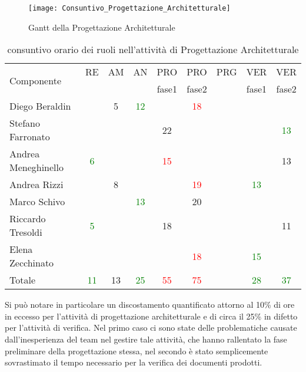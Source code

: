 \begin{figure}[h]
  \texttt{[image: Consuntivo\_Progettazione\_Architetturale]}
\caption{Gantt della Progettazione Architetturale}\label{fig:ganttprogconsuntivo}
\end{figure}

\begin{table}[h]
\centering
\begin{tabular}{|l|c|c|c|c|c|c|c|c|}
\hline
\multirow{2}{*}{Componente}& RE& AM& AN& PRO& PRO& PRG& VER& VER\\
                    &    &      &      &fase1          &fase2         &        &fase1	 &fase2\\ 
\hline
Diego Beraldin 	& & 5& \textcolor{green}{12}& & \textcolor{red}{18}& & &\\
Stefano Farronato & & & & 22& & & & \textcolor{green}{13}\\
Andrea Meneghinello & \textcolor{green}{6}& & & \textcolor{red}{15}& & & & 13\\
Andrea Rizzi & & 8& & & \textcolor{red}{19}& & \textcolor{green}{13}& \\
Marco Schivo & & & \textcolor{green}{13}& & 20& & & \\
Riccardo Tresoldi & \textcolor{green}{5}& & & 18& & & & 11\\
Elena Zecchinato & & & & & \textcolor{red}{18}& & \textcolor{green}{15}& \\
\hline
Totale & \textcolor{green}{11}& 13& \textcolor{green}{25}&\textcolor{red} {55}& \textcolor{red}{75}& & \textcolor{green}{28}& \textcolor{green}{37}\\
\hline
\end{tabular}
\caption{consuntivo orario dei ruoli nell'attività di Progettazione Architetturale}\label{tab:consruoliprog}
\end{table}


Si può notare in particolare un discostamento quantificato attorno al 10\% di ore in eccesso per l'attività di progettazione architetturale e di circa il 25\% in difetto per l'attività di verifica. Nel primo caso ci sono state delle problematiche causate dall'inesperienza del team nel gestire tale attività, che hanno rallentato la fase preliminare della progettazione stessa, nel secondo è stato semplicemente sovrastimato il tempo necessario per la verifica dei documenti prodotti.

